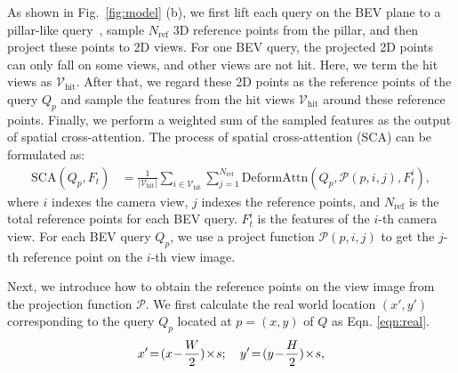 \documentclass{article}
\begin{document}
As shown in Fig.~\ref{fig:model} (b),
we first lift each query on the BEV plane to
a pillar-like query~\cite{lang2019pointpillars}, sample ${N_\text{ref}}$ 3D reference points from the pillar, and then project these points to 2D views. For one BEV query, the projected 2D points can only fall on some views, and other views are not hit. Here, we term the hit views as $\mathcal{V}_\text{hit}$.
After that, we regard these 2D points
as the reference points of the query $Q_p$ and sample the features from the hit views $\mathcal{V}_\text{hit}$ around these
reference points.
Finally, we perform a weighted sum of the sampled features as the output of spatial cross-attention.
The process of spatial cross-attention (SCA) can be formulated as:
\begin{align}\label{sca}
    \text{SCA}(Q_p, F_t) &= \frac{1}{|\mathcal{V}_\text{hit}|} \sum_{i\in \mathcal{V}_\text{hit}} \sum_{j=1}^{{N_\text{ref}}}
    \text{DeformAttn}(Q_p, \mathcal{P}(p,i,j), F_t^i),
\end{align}
where $i$ indexes the camera view, $j$ indexes the reference points, and ${N_\text{ref}}$ is the total reference points for each BEV query. $F_t^i$ is the features of the $i$-th camera view. For each BEV query $Q_p$, we use a project function $\mathcal{P}(p, i, j)$ to get the $j$-th reference point on the $i$-th view image.



Next, we introduce how to obtain the reference points on the view image from the projection  function $\mathcal{P}$.
We first calculate the real world location $(x', y')$ corresponding to the query $Q_p$ located at $p=(x,y)$ of $Q$ as Eqn. \ref{eqn:real}.
\begin{equation}{\label{eqn:real}}
    x'\!=\! (x\!-\!\frac{W}{2})\!\times\! s; \quad y'\! = \!(y\!-\!\frac{H}{2})\!\times\! s,
\end{equation}
\end{document}
